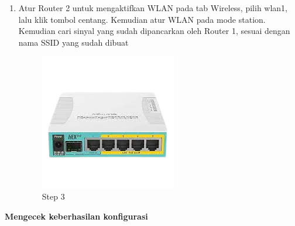 \begin{enumerate}
	\item Atur Router 2 untuk mengaktifkan WLAN pada tab Wireless, pilih wlan1, lalu klik tombol centang.
	Kemudian atur WLAN pada mode station. Kemudian cari sinyal yang sudah dipancarkan oleh
	Router 1, sesuai dengan nama SSID yang sudah dibuat
	\begin{figure}[H]
		\centering
		\includegraphics[width=0.5\linewidth]{P1/img/contoh.png}
		\caption{Step 3}
		\label{fig:gambar7}
	\end{figure}

\end{enumerate}

\begin{center} 
	\textbf{Mengecek keberhasilan konfigurasi}
\end{center}


